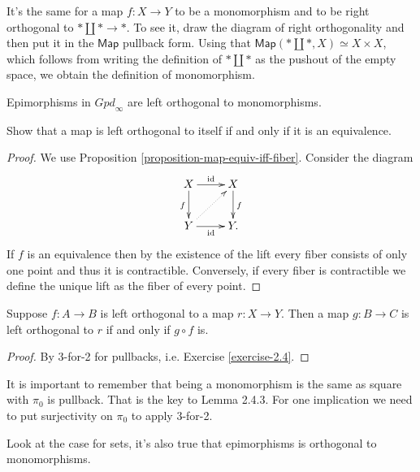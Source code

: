 \begin{example}
\label{example-monom-iff-right-ortho-pusho}
It's the same for a map $f:X \to Y$ to be
a monomorphism and to be
right orthogonal to $* \amalg * \to *$.
To see it, draw the diagram of right
orthogonality
and then put it in the $\mathsf{Map}$
pullback form.
Using that $\mathsf{Map}(* \amalg *,X)\simeq
X\times X$,
which follows from writing the
definition of $* \amalg *$ as the pushout of
the empty space, we obtain the definition of
monomorphism.
\end{example}


\begin{lemma}
\label{lemma-epimo-left-ortho-monom}
Epimorphisms in $\mathit{Gpd}_{\infty}$ are
left orthogonal to
monomorphisms.
\end{lemma}

\begin{exercise}
\label{exercise-2.11}
Show that a map is left orthogonal
to itself if and only if it is an
equivalence.
\end{exercise}

\begin{proof}
We use Proposition
\ref{proposition-map-equiv-iff-fiber}.
Consider the diagram
$$
\xymatrix{
X\ar[r]^{\text{id}}\ar[d]_{f}&X\ar[d]^{f}\\
Y\ar[r]_{\text{id}}\ar@{.>}[ur]&Y.
}
$$
If $f$ is an equivalence then
by the existence of the lift
every fiber consists of only one point and
thus it is contractible.
Conversely, if every fiber is contractible
we define the unique lift as the fiber of
every point.
\end{proof}

\begin{lemma}
\label{lemma-orthogonality-and-composition}
Suppose $f:A \to B$ is left orthogonal
to a map $r:X \to Y$.
Then a map $g:B \to C$ is left
orthogonal to $r$ if and only if $g \circ f$
is.
\end{lemma}

\begin{proof}
By 3-for-2 for pullbacks, i.e. Exercise
\ref{exercise-2.4}.
\end{proof}

It is important to remember that
being a monomorphism is the same
as square with $\pi_0$ is pullback.
That is the key to Lemma 2.4.3.
For one implication we need
to put surjectivity on $\pi_0$
to apply 3-for-2.

Look at the case for sets,
it's also true that epimorphisms
is orthogonal to monomorphisms.

